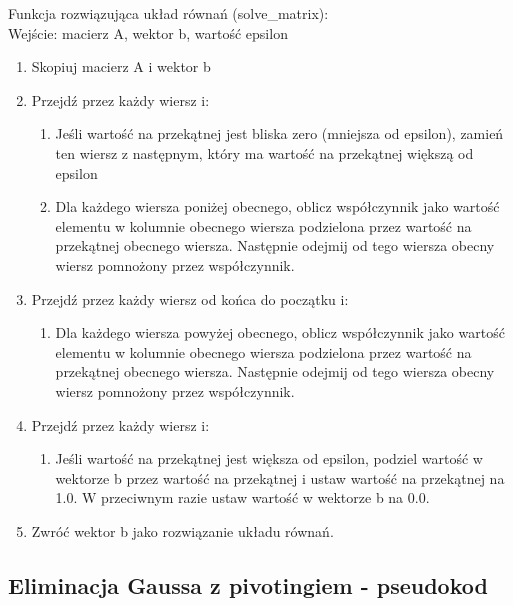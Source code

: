 \documentclass[a4paper]{article}
\begin{document}
Funkcja rozwiązująca układ równań (solve\_matrix):\\
Wejście: macierz A, wektor b, wartość epsilon
\begin{enumerate}
    \item Skopiuj macierz A i wektor b
    \item Przejdź przez każdy wiersz i:
          \begin{enumerate}
              \item Jeśli wartość na przekątnej jest bliska zero (mniejsza od epsilon), zamień ten wiersz z następnym, który ma wartość na przekątnej większą od epsilon
              \item Dla każdego wiersza poniżej obecnego, oblicz współczynnik jako wartość elementu w kolumnie obecnego wiersza podzielona przez wartość na przekątnej obecnego wiersza. Następnie odejmij od tego wiersza obecny wiersz pomnożony przez współczynnik.
          \end{enumerate}
    \item Przejdź przez każdy wiersz od końca do początku i:
          \begin{enumerate}
              \item Dla każdego wiersza powyżej obecnego, oblicz współczynnik jako wartość elementu w kolumnie obecnego wiersza podzielona przez wartość na przekątnej obecnego wiersza. Następnie odejmij od tego wiersza obecny wiersz pomnożony przez współczynnik.
          \end{enumerate}
    \item Przejdź przez każdy wiersz i:
          \begin{enumerate}
              \item Jeśli wartość na przekątnej jest większa od epsilon, podziel wartość w wektorze b przez wartość na przekątnej i ustaw wartość na przekątnej na 1.0. W przeciwnym razie ustaw wartość w wektorze b na 0.0.
          \end{enumerate}
    \item Zwróć wektor b jako rozwiązanie układu równań.
\end{enumerate}




\subsection{Eliminacja Gaussa z pivotingiem - pseudokod}
\end{document}
